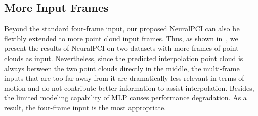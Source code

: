 \documentclass[10pt,twocolumn,letterpaper]{article}
\begin{document}
\begin{table}
\renewcommand\arraystretch{1.1}
\centering
\caption{\textbf{Quantitative results with different numbers of input frames for NeuralPCI.} Among them, \textit{2 frames} input indicates the pair frame setting and \textit{4 frames} input is the standard setting in our main paper. }
\label{tab:input frames}
\end{table}



 

\subsection{More Input Frames}

Beyond the standard four-frame input, our proposed NeuralPCI can also be flexibly extended to more point cloud input frames. Thus, as shown in~, we present the results of NeuralPCI on two datasets with more frames of point clouds as input. Nevertheless, since the predicted interpolation point cloud is always between the two point clouds directly in the middle, the multi-frame inputs that are too far away from it are dramatically less relevant in terms of motion and do not contribute better information to assist interpolation. Besides, the limited modeling capability of MLP causes performance degradation. As a result, the four-frame input is the most appropriate.
\end{document}
